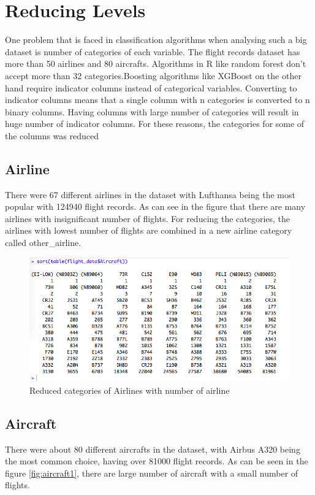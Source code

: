 \section{Reducing Levels}
One problem that is faced in classification algorithms when analysing such a big dataset is number of categories of each variable. The flight records dataset has more than 50 airlines and 80 aircrafts. Algorithms in R like random forest don't accept more than 32 categories.Boosting algorithms like XGBoost on the other hand require indicator columns instead of categorical variables. Converting to indicator columns means that a single column with n categories is converted to n binary columns. Having columns with large number of categories will result in huge number of indicator columns. For these reasons, the categories for some of the columns was reduced

\subsection{Airline}
There were 67 different airlines in the dataset with Lufthansa being the most popular with 124940 flight records. As can see in the figure  that there are many airlines with insignificant number of flights. 
For reducing the categories, the airlines with lowest number of flights are combined in a new airline category called other\_airline.

\begin{figure}[ht]
    \centering
    \includegraphics[width=\textwidth]{Figures/Aircraft_orig_levels.png}
    \caption{Reduced categories of Airlines with number of airline}
    \label{fig:airline2}
\end{figure}

\subsection{Aircraft}
There were about 80 different aircrafts in the dataset, with Airbus A320 being the most common choice, having over 81000 flight records. As can be seen in the figure \ref{fig:aircraft1}, there are large number of aircraft with a small number of flights.

